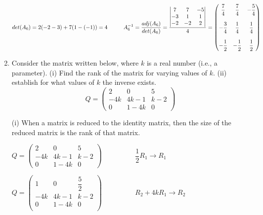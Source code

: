 \documentclass[fleqn]{article}
\begin{document}
\begin{enumerate}
      \textcolor{hwColor}{
        $
        det(A_6)=2(-2-3)+7(1-(-1))=4
        \hskip 1truecm
        A_6^{-1}=\dfrac{adj(A_6)}{det(A_6)}=\dfrac{
          \begin{vmatrix}
           7 & 7 & -5 \\
           -3 & 1 & 1 \\
           -2 & -2 & 2 \\
          \end{vmatrix}
        }{4}=\begin{pmatrix}
         \dfrac{7}{4} & \dfrac{7}{4} & -\dfrac{5}{4} \\
         \\
         -\dfrac{3}{4} & \dfrac{1}{4} & \dfrac{1}{4} \\
         \\
         -\dfrac{1}{2} & -\dfrac{1}{2} & \dfrac{1}{2} \\
        \end{pmatrix}
        $
      }

    
    \item  Consider the matrix written below, where $k$ is a real number (i.e., a parameter). (i) Find the rank of the matrix for varying values of $k$. (ii) establish for what values of $k$ the inverse exists. 
      $$
      Q = 
      \begin{pmatrix}
      2 & 0 & 5 \\
      -4k & 4k-1 & k-2 \\
      0 & 1-4k & 0
      \end{pmatrix}
      $$

      \textcolor{hwColor}{
        (i) When a matrix is reduced to the identity matrix, then the size of the reduced matrix is the rank of that matrix.
      }

      \textcolor{hwColor}{
        $
        Q = 
          \begin{pmatrix}
          2 & 0 & 5 \\
          -4k & 4k-1 & k-2 \\
          0 & 1-4k & 0
          \end{pmatrix}
          \hspace{2cm} \dfrac{1}{2}R_1 \longrightarrow R_1 \hspace{2cm}
        $
      }

      \textcolor{hwColor}{
        $
          Q=\begin{pmatrix}
            1 & 0 & \dfrac{5}{2} \\
            -4k & 4k-1 & k-2 \\
            0 & 1-4k & 0 \\
          \end{pmatrix}
          \hspace{2cm} R_2+4kR_1 \longrightarrow R_2 \hspace{1cm}
        $
      }


\end{enumerate}
\end{document}

